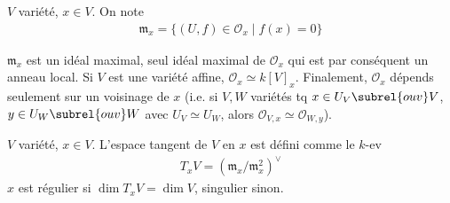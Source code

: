         \begin{defi}
            $V$ variété, $x \in V$. On note 
            \begin{align*}
                \mathfrak{m}_x = \{(U,f) \in \mathcal{O}_x \mid f(x) = 0\}
            \end{align*}
        \end{defi}
        \begin{exo}
            $\mathfrak{m}_x$ est un idéal maximal, seul idéal maximal de $\mathcal{O}_x$ qui est par conséquent un anneau local. Si $V$ est une variété affine, $\mathcal{O}_x \simeq k[V]_x$. Finalement, $\mathcal{O}_x$ dépends seulement sur un voisinage de $x$ (i.e. si $V,W$ variétés tq $x \in U_V \subrel{ouv} V$, $y \in U_W \subrel{ouv} W$ avec $U_V \simeq U_W$, alors $\mathcal{O}_{V,x} \simeq \mathcal{O}_{W,y}$).
        \end{exo}
        \begin{defi}
            $V$ variété, $x \in V$. L'espace tangent de $V$ en $x$ est défini comme le $k$-ev
            \begin{align*}
                T_xV = (\mathfrak{m}_x/\mathfrak{m}_x^2)^\vee
            \end{align*}
            $x$ est régulier si $\dim T_xV = \dim V$, singulier sinon.
        \end{defi}


